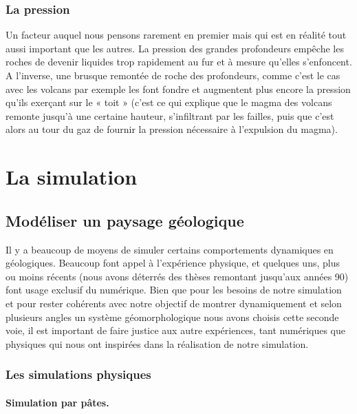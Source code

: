 \documentclass[a4paper,11pt]{article}
\begin{document}
\subsubsection{La pression}

Un facteur auquel nous pensons rarement en premier mais qui est en réalité tout aussi important que les autres.
La pression des grandes profondeurs empêche les roches de devenir liquides trop rapidement au fur et à mesure qu'elles s'enfoncent.
A l'inverse, une brusque remontée de roche des profondeurs, comme c'est le cas avec les volcans par exemple les font fondre et augmentent plus encore la pression qu'ils exerçant sur le « toit » (c'est ce qui explique que le magma des volcans remonte jusqu'à une certaine hauteur, s'infiltrant par les failles, puis que c'est alors au tour du gaz de fournir la pression nécessaire à l'expulsion du magma).

\section{La simulation}

\subsection{Modéliser un paysage géologique}

Il y a beaucoup de moyens de simuler certains comportements dynamiques en géologiques. Beaucoup font appel à l'expérience physique, et quelques uns, plus ou moins récents (nous avons déterrés des thèses remontant jusqu'aux années 90) font usage exclusif du numérique. Bien que pour les besoins de notre simulation et pour rester cohérents avec notre objectif de montrer dynamiquement et selon plusieurs angles un système géomorphologique nous avons choisis cette seconde voie, il est important de faire justice aux autre expériences, tant numériques que physiques qui nous ont inspirées dans la réalisation de notre simulation.

\subsubsection{Les simulations physiques}

\paragraph{Simulation par pâtes.}
\end{document}
